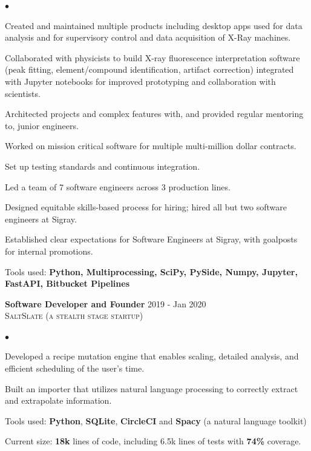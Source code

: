 \documentclass{article}
\newcommand{\experience}[4]{{\vspace{0pt}\bf{#1}} \hfill  #2\\{\textsc{#3} \hfill \emph{#4}\\  }}
\newenvironment{achievements}{\begin{list}{$\bullet$}{\topsep 0pt \itemsep -2pt}}{\vspace*{4pt}\end{list}}
\begin{document}
\begin{achievements}
   \item Created and maintained multiple products including desktop apps used for data analysis and for supervisory control and data acquisition of X-Ray machines. 
   \item Collaborated with physicists to build X-ray fluorescence interpretation software (peak fitting, element/compound identification, artifact correction) integrated with Jupyter notebooks for improved prototyping and collaboration with scientists.
    \item Architected projects and complex features with, and provided regular mentoring to, junior engineers.
    \item Worked on mission critical software for multiple multi-million dollar contracts. 
    \item Set up testing standards and continuous integration.

    \item Led a team of 7 software engineers across 3 production lines. 
    
    \item Designed equitable skills-based process for hiring; hired all but two software engineers at Sigray.  
    \item Established clear expectations for Software Engineers at Sigray, with goalposts for internal promotions. 
    \item Tools used: \bf{Python, Multiprocessing, SciPy, PySide, Numpy, Jupyter, FastAPI, Bitbucket Pipelines}
\end{achievements}

\experience{Software Developer and Founder}{2019 - Jan 2020}{SaltSlate \textnormal{(a stealth stage startup)}}{}
\begin{achievements}
	\item Developed a recipe mutation engine that enables scaling, detailed analysis, and efficient scheduling of the user's time.
	
	\item Built an importer that utilizes natural language processing to correctly extract and extrapolate information.
	
	\item Tools used: \textbf{Python}, \textbf{SQLite}, 
 \textbf{CircleCI} and \textbf{Spacy} (a natural language toolkit)
	\item Current size: \textbf{18k} lines of code, including 6.5k lines of tests with \textbf{74\%} coverage.
	
	\end{achievements}
\end{document}
